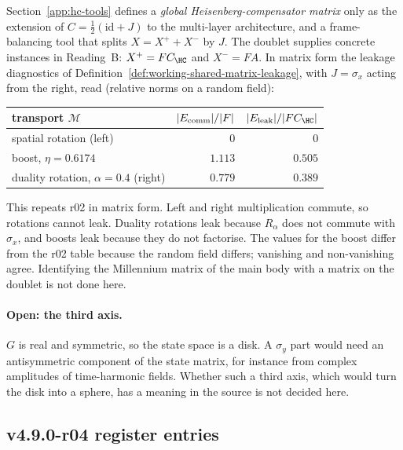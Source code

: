 Section~\ref{app:hc-tools} defines a \emph{global Heisenberg-compensator matrix} only as the extension of
\(C=\tfrac12(\mathrm{id}+J)\) to the multi-layer architecture, and a frame-balancing tool that splits \(X=X^++X^-\) by
\(J\).  The doublet supplies concrete instances in Reading~B: \(X^+=FC_{\HC}\) and \(X^-=FA\).  In matrix form the leakage
diagnostics of Definition~\ref{def:working-shared-matrix-leakage}, with \(J=\sigma_x\) acting from the right, read
(relative norms on a random field):
\begin{center}
\small
\begin{tabular}{@{}lrr@{}}
\toprule
transport \(\mathcal M\) & \(|E_{\rm comm}|/|F|\) & \(|E_{\rm leak}|/|FC_{\HC}|\)\\
\midrule
spatial rotation (left) & \(0\) & \(0\)\\
boost, \(\eta=0.6174\) & \(1.113\) & \(0.505\)\\
duality rotation, \(\alpha=0.4\) (right) & \(0.779\) & \(0.389\)\\
\bottomrule
\end{tabular}
\end{center}
This repeats r02 in matrix form.  Left and right multiplication commute, so rotations cannot leak.  Duality rotations
leak because \(R_\alpha\) does not commute with \(\sigma_x\), and boosts leak because they do not factorise.  The values
for the boost differ from the r02 table because the random field differs; vanishing and non-vanishing agree.  Identifying
the Millennium matrix of the main body with a matrix on the doublet is not done here.

\paragraph{Open: the third axis.}
\(G\) is real and symmetric, so the state space is a disk.  A \(\sigma_y\) part would need an antisymmetric component of
the state matrix, for instance from complex amplitudes of time-harmonic fields.  Whether such a third axis, which would
turn the disk into a sphere, has a meaning in the source is not decided here.

\subsection*{v4.9.0-r04 register entries}
\label{subsec:v490-r04-register}

